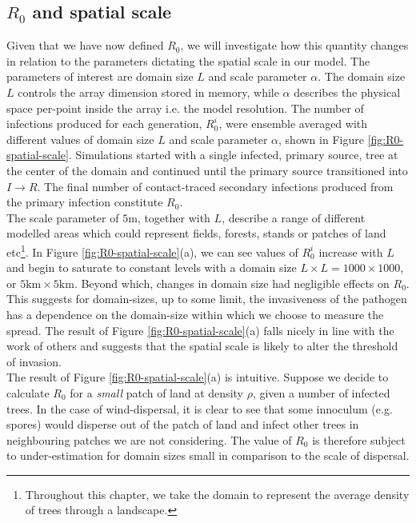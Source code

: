 
\subsection{$R_0$ and spatial scale}

Given that we have now defined $R_0$, we will investigate how this quantity changes in relation %
to the parameters dictating the spatial scale in our model. %
The parameters of interest are domain size $L$ and scale parameter $\alpha$. %
The domain size $L$ controls the array dimension stored in  memory, while $\alpha$ %
describes the physical space per-point inside the array i.e. the model resolution. %
The number of infections produced for each generation, $R_0^i$, were ensemble averaged with %
different values of domain size $L$ and scale parameter $\alpha$, %
shown in Figure \ref{fig:R0-spatial-scale}. Simulations started with a single infected, %
primary source, tree at the center of the domain and continued until the primary source %
transitioned into $I\rightarrow R$. %
The final number of contact-traced secondary infections produced from the primary infection %
constitute $R_0$.\\

The scale parameter of $5\mathrm{m}$, together with $L$, describe a range of different modelled %
areas which could represent fields, forests, stands or patches of land etc\footnote{Throughout this chapter, %
we take the domain to represent the average density of trees through a landscape.}. %
In Figure \ref{fig:R0-spatial-scale}(a), we can see values of $R_0^i$ increase with $L$ and %
begin to saturate to constant levels with a domain size $L\times L=1000\times 1000$, or $5\mathrm{km}\times 5 \mathrm{km}$. %
Beyond which, changes in domain size had negligible effects on $R_0$. %
This suggests for domain-sizes, up to some limit, the invasiveness of the pathogen has a %
dependence on the domain-size within which we choose to measure the spread. %
The result of Figure \ref{fig:R0-spatial-scale}(a) falls nicely in line with the work of %
others \cite{mikaberidze2016invasiveness} and suggests that the spatial scale is likely to %
alter the threshold of invasion.\\

The result of Figure \ref{fig:R0-spatial-scale}(a) is intuitive. %
Suppose we decide to calculate $R_0$ for a \textit{small} patch of land at density $\rho$, %
given a number of infected trees. In the case of wind-dispersal, it is clear to see that some %
innoculum (e.g. spores) would disperse out of the patch of land and infect other trees in %
neighbouring patches we are not considering. The value of $R_0$ is therefore subject to %
under-estimation for domain sizes small in comparison to the scale of dispersal.\\ 

